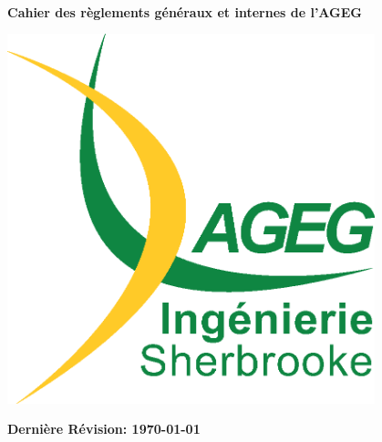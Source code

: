 \setcounter{reglement}{0}
\renewcommand{\thepage}{RG \arabic{page}}
\begin{titlepage}
\begin{center}

\vfill~\\[1cm]
{\Huge \bfseries Cahier des règlements généraux et internes de l'AGEG}

\vfill

\includegraphics[width=0.8\textwidth]{./Images/A11-LogoAGEG-002-AJC.eps}~\\[1cm]

\vfill

{\bfseries \LARGE Dernière Révision: \today}

\end{center}
\end{titlepage}
